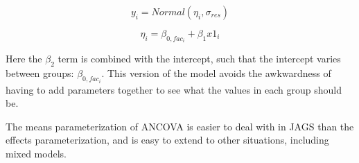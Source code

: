 \documentclass[
  13,
  letterpaper,
]{report}
\newenvironment{Shaded}{\begin{snugshade}}{\end{snugshade}}
\newcommand{\AttributeTok}[1]{\textcolor[rgb]{0.40,0.45,0.13}{#1}}
\newcommand{\CommentTok}[1]{\textcolor[rgb]{0.37,0.37,0.37}{#1}}
\newcommand{\DecValTok}[1]{\textcolor[rgb]{0.68,0.00,0.00}{#1}}
\newcommand{\FloatTok}[1]{\textcolor[rgb]{0.68,0.00,0.00}{#1}}
\newcommand{\FunctionTok}[1]{\textcolor[rgb]{0.28,0.35,0.67}{#1}}
\newcommand{\NormalTok}[1]{\textcolor[rgb]{0.00,0.23,0.31}{#1}}
\newcommand{\OtherTok}[1]{\textcolor[rgb]{0.00,0.23,0.31}{#1}}
\newcommand{\SpecialCharTok}[1]{\textcolor[rgb]{0.37,0.37,0.37}{#1}}
\begin{document}
\[y_i=Normal\left(\eta_i,\sigma_{res}\right)\]

\[\eta_i=\beta_{0,{fac}_i}+\beta_1{x1}_i\]

Here the \(\beta_2\) term is combined with the intercept, such that the
intercept varies between groups: \(\beta_{0,{fac}_i}\). This version of
the model avoids the awkwardness of having to add parameters together to
see what the values in each group should be.

The means parameterization of ANCOVA is easier to deal with in JAGS than
the effects parameterization, and is easy to extend to other situations,
including mixed models.

\begin{Shaded}
\end{Shaded}
\end{document}
